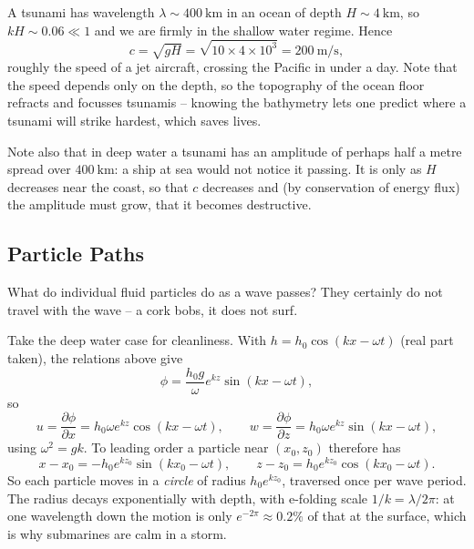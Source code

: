 \documentclass[a4paper]{scrartcl}
\newcommand{\pd}[2]{\frac{\partial #1}{\partial #2}}
\begin{document}
\begin{example}[Tsunami]
	A tsunami has wavelength $\lambda \sim \SI{400}{\kilo\meter}$ in an ocean of depth $H \sim \SI{4}{\kilo\meter}$, so $kH \sim 0.06 \ll 1$ and we are firmly in the shallow water regime. Hence
	$$
	c = \sqrt{gH} = \sqrt{10\times 4\times 10^3} = \SI{200}{\meter\per\second},
	$$
	roughly the speed of a jet aircraft, crossing the Pacific in under a day. Note that the speed depends only on the depth, so the topography of the ocean floor refracts and focusses tsunamis -- knowing the bathymetry lets one predict where a tsunami will strike hardest, which saves lives.

	Note also that in deep water a tsunami has an amplitude of perhaps half a metre spread over $\SI{400}{\kilo\meter}$: a ship at sea would not notice it passing. It is only as $H$ decreases near the coast, so that $c$ decreases and (by conservation of energy flux) the amplitude must grow, that it becomes destructive.
\end{example}

\subsection{Particle Paths}

What do individual fluid particles do as a wave passes? They certainly do not travel with the wave -- a cork bobs, it does not surf.

Take the deep water case for cleanliness. With $h = h_0\cos(kx - \omega t)$ (real part taken), the relations above give
$$
\phi = \frac{h_0 g}{\omega}e^{kz}\sin(kx - \omega t),
$$
so
$$
u = \pd{\phi}{x} = h_0 \omega e^{kz}\cos(kx - \omega t), \qquad w = \pd{\phi}{z} = h_0\omega e^{kz}\sin(kx - \omega t),
$$
using $\omega^2 = gk$. To leading order a particle near $(x_0, z_0)$ therefore has
$$
x - x_0 = -h_0 e^{kz_0}\sin(kx_0 - \omega t), \qquad z - z_0 = h_0 e^{kz_0}\cos(kx_0 - \omega t).
$$
So each particle moves in a \emph{circle} of radius $h_0 e^{kz_0}$, traversed once per wave period. The radius decays exponentially with depth, with e-folding scale $1/k = \lambda/2\pi$: at one wavelength down the motion is only $e^{-2\pi} \approx 0.2\%$ of that at the surface, which is why submarines are calm in a storm.
\end{document}
